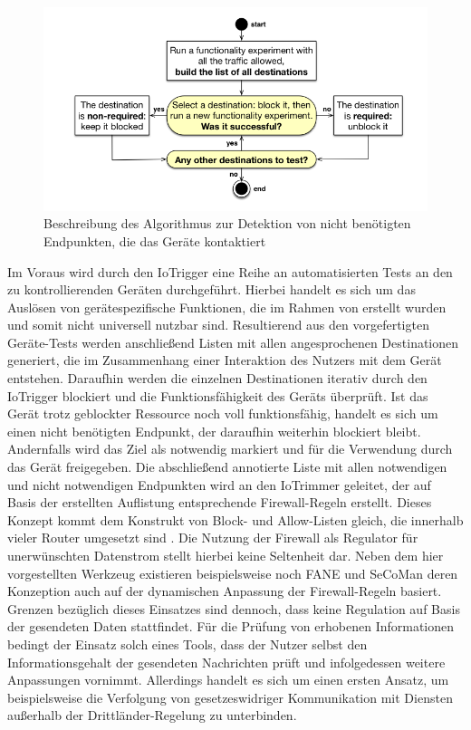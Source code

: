 \begin{figure}
    \centering
    \includegraphics[width=\textwidth]{main/countermeasures/pictures/Identification_Non_Essential_Traffic}
    \caption{Beschreibung des Algorithmus zur Detektion von nicht benötigten Endpunkten, die das Geräte kontaktiert \cite{Mandalari2021}}
    \label{fig:iotrigger-iotrimmer}
\end{figure}

\noindent Im Voraus wird durch den IoTrigger eine Reihe an automatisierten Tests an den zu kontrollierenden Geräten durchgeführt. Hierbei handelt es sich um das Auslösen von gerätespezifische Funktionen, die im Rahmen von \cite[p. 13-14]{Mandalari2021} erstellt wurden und somit nicht universell nutzbar sind. 
Resultierend aus den vorgefertigten Geräte-Tests werden anschließend Listen mit allen angesprochenen Destinationen generiert, die im Zusammenhang einer Interaktion des Nutzers mit dem Gerät entstehen. Daraufhin werden die einzelnen Destinationen iterativ durch den IoTrigger blockiert und die Funktionsfähigkeit des Geräts überprüft. 
Ist das Gerät trotz geblockter Ressource noch voll funktionsfähig, handelt es sich um einen nicht benötigten Endpunkt, der daraufhin weiterhin blockiert bleibt. Andernfalls wird das Ziel als notwendig markiert und für die Verwendung durch das Gerät freigegeben. 
Die abschließend annotierte Liste mit allen notwendigen und nicht notwendigen Endpunkten wird an den IoTrimmer geleitet, der auf Basis der erstellten Auflistung entsprechende Firewall-Regeln erstellt. Dieses Konzept kommt dem Konstrukt von Block- und Allow-Listen gleich, die innerhalb vieler Router umgesetzt sind \cite{FritzBox2022}.
Die Nutzung der Firewall als Regulator für unerwünschten Datenstrom stellt hierbei keine Seltenheit dar. Neben dem hier vorgestellten Werkzeug existieren beispielsweise noch FANE \cite{Haar2019} und SeCoMan \cite{Huertas2016} deren Konzeption auch auf der dynamischen Anpassung der Firewall-Regeln basiert. Grenzen bezüglich dieses Einsatzes sind dennoch, dass keine Regulation auf Basis der gesendeten Daten stattfindet. 
Für die Prüfung von erhobenen Informationen bedingt der Einsatz solch eines Tools, dass der Nutzer selbst den Informationsgehalt der gesendeten Nachrichten prüft und infolgedessen weitere Anpassungen vornimmt. Allerdings handelt es sich um einen ersten Ansatz, um beispielsweise die Verfolgung von gesetzeswidriger Kommunikation mit Diensten außerhalb der Drittländer-Regelung \cite{Dsgvo2016} zu unterbinden.

